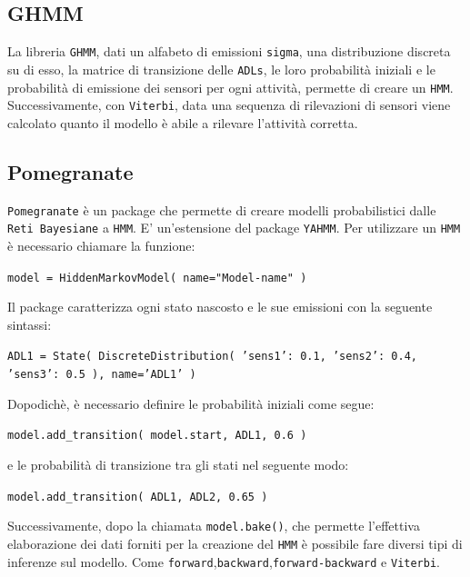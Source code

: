 \documentclass[12pt, a4paper]{scrartcl}
\begin{document}
\subsection*{GHMM}
La libreria \texttt{GHMM}, dati un alfabeto di emissioni \texttt{sigma}, una distribuzione discreta su di esso, la matrice di transizione delle \texttt{ADLs}, le loro probabilità iniziali e le probabilità di emissione dei sensori per ogni attività, permette di creare un \texttt{HMM}. Successivamente, con \texttt{Viterbi}, data una sequenza di rilevazioni di sensori viene calcolato quanto il modello è abile a rilevare l'attività corretta.
\subsection*{Pomegranate}
\texttt{Pomegranate} è un package che permette di creare modelli probabilistici dalle \texttt{Reti Bayesiane} a \texttt{HMM}. E' un'estensione del package \texttt{YAHMM}. Per utilizzare un \texttt{HMM} è necessario chiamare la funzione: 
\begin{center}\begin{addmargin}[2em]{2em}
\texttt{model = HiddenMarkovModel( name="Model-name" )}
\end{addmargin}\end{center}




 Il package caratterizza ogni stato  nascosto e le sue emissioni con la seguente sintassi:
\begin{center}\begin{addmargin}[2em]{2em}
\texttt{ADL1 = State( DiscreteDistribution({ 'sens1': 0.1, 'sens2': 0.4, 'sens3': 0.5 }), name='ADL1' )}
\end{addmargin}\end{center}
Dopodichè, è necessario definire le probabilità iniziali come segue:
\begin{center}\begin{addmargin}[2em]{2em}
\texttt{model.add\_transition( model.start, ADL1, 0.6 )}
\end{addmargin}\end{center}
e le probabilità di transizione tra gli stati nel seguente modo:
\begin{center}\begin{addmargin}[2em]{2em}
\texttt{model.add\_transition( ADL1, ADL2, 0.65 )}
\end{addmargin}\end{center}

Successivamente, dopo la chiamata \texttt{model.bake()}, che permette l'effettiva elaborazione dei dati forniti per la creazione del \texttt{HMM} è possibile fare diversi tipi di inferenze sul modello. Come \texttt{forward},\texttt{backward},\texttt{forward-backward} e \texttt{Viterbi}.
\end{document}
